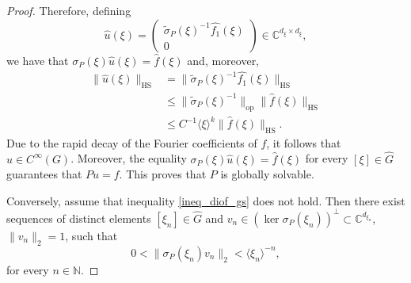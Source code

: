 \documentclass[11pt]{amsart}
\numberwithin{theorem}{section}
\numberwithin{equation}{section}
\theoremstyle{definition}
\numberwithin{example}{section}
\theoremstyle{definition}
\theoremstyle{definition}
\newcommand{\N}{\mathbb{N}}
\newcommand{\C}{\mathbb{C}}
\newcommand{\HS}{\operatorname{HS}}
\begin{document}
\begin{proof}
Therefore, defining
\begin{equation*}
    \widehat{u}(\xi)=\begin{pmatrix}
        \tilde \sigma_P(\xi)^{-1}\widehat{f_1}(\xi)\\
        0
    \end{pmatrix}\in\C^{d_\xi\times d_\xi},
\end{equation*}
we have that $\sigma_P(\xi)\widehat{u}(\xi)=\widehat{f}(\xi)$ and, moreover,
\begin{align*}
    \|\widehat{u}(\xi)\|_{\HS}&=\| \tilde \sigma_P(\xi)^{-1}\widehat{f_1}(\xi)\|_{\HS}\\
    &\leq \| \tilde \sigma_P(\xi)^{-1}\|_{\operatorname{op}}\|\widehat{f}(\xi)\|_{\HS}\\
    &\leq C^{-1}\langle \xi \rangle^{k}\|\widehat{f}(\xi)\|_{\HS}.
\end{align*}
Due to the rapid decay of the Fourier coefficients of $f$, it follows that $u\in C^\infty(G)$. Moreover, the equality $\sigma_P(\xi)\widehat{u}(\xi)=\widehat{f}(\xi)$ for every $[\xi]\in\widehat{G}$ guarantees that $Pu=f$. This proves that $P$ is globally solvable.

Conversely, assume that inequality \eqref{ineq_diof_gs} does not hold. Then there exist sequences of distinct elements $[\xi_n]\in\widehat{G}$ and $v_{n}\in (\ker \sigma_P(\xi_n))^\perp\subset \C^{d_{\xi_n}}$, $\|v_n\|_2=1$, such that
\begin{equation*}
  0< \| \sigma_P(\xi_n)v_n\|_2<\langle \xi_n \rangle ^{-n},
\end{equation*}
for every $n\in\N$.


\end{proof}
\end{document}

